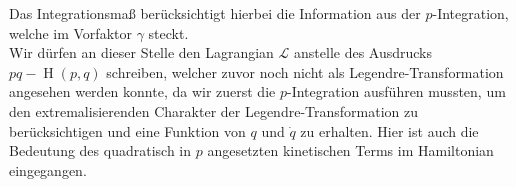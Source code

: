  Das Integrationsmaß berücksichtigt hierbei die Information aus der $p$-Integration, welche im Vorfaktor $\gamma$ steckt. \\
 Wir dürfen an dieser Stelle den Lagrangian $\mathcal{L}$ anstelle des Ausdrucks \ $pq - \operatorname{H}(p,q)$ schreiben, welcher zuvor noch nicht als Legendre-Transformation angesehen werden konnte, da wir zuerst die $p$-Integration ausführen mussten, um den extremalisierenden Charakter der Legendre-Transformation zu berücksichtigen  und eine Funktion von $q$ und $\dot{q}$ zu erhalten. Hier ist auch die Bedeutung des quadratisch in $p$ angesetzten kinetischen Terms im Hamiltonian eingegangen. 